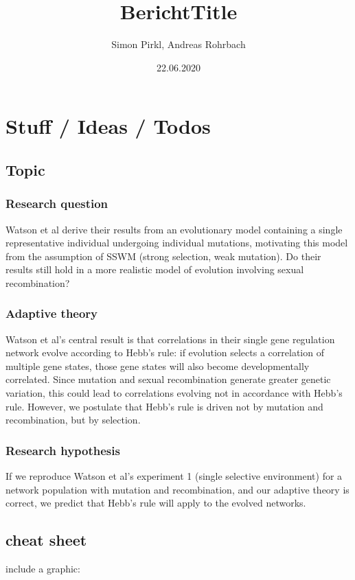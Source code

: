 \documentclass{article}
\title{BerichtTitle}
\date{22.06.2020}
\author{Simon Pirkl, Andreas Rohrbach}
\begin{document}
\maketitle

\tableofcontents
\newpage

\section{Stuff / Ideas / Todos}

\subsection{Topic}
\subsubsection{Research question}
Watson et al derive their results from an evolutionary model containing a single representative individual undergoing individual mutations, motivating this model from the assumption of SSWM (strong selection, weak mutation). Do their results still hold in a more realistic model of evolution involving sexual recombination?

\subsubsection{Adaptive theory}
Watson et al’s central result is that correlations in their single gene regulation network evolve according to Hebb’s rule: if evolution selects a correlation of multiple gene states, those gene states will also become developmentally correlated. Since mutation and sexual recombination generate greater genetic variation, this could lead to correlations evolving not in accordance with Hebb's rule. However, we postulate that Hebb’s rule is driven not by mutation and recombination, but by selection.

\subsubsection{Research hypothesis}
If we reproduce Watson et al’s experiment 1 (single selective environment) for a network population with mutation and recombination, and our adaptive theory is correct, we predict that Hebb’s rule will apply to the evolved networks.

\subsection{cheat sheet}
include a graphic:
\end{document}
